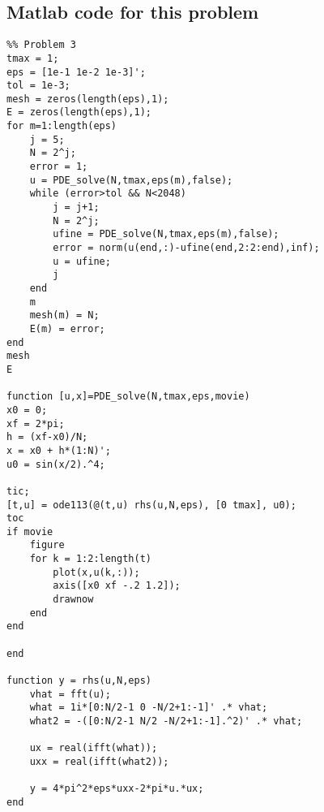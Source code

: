 \subsection*{Matlab code for this problem}
\begin{verbatim}
%% Problem 3
tmax = 1;
eps = [1e-1 1e-2 1e-3]';
tol = 1e-3;
mesh = zeros(length(eps),1);
E = zeros(length(eps),1);
for m=1:length(eps)
    j = 5;
    N = 2^j;
    error = 1;
    u = PDE_solve(N,tmax,eps(m),false);
    while (error>tol && N<2048)
        j = j+1;
        N = 2^j;
        ufine = PDE_solve(N,tmax,eps(m),false);
        error = norm(u(end,:)-ufine(end,2:2:end),inf);
        u = ufine;
        j
    end
    m
    mesh(m) = N;
    E(m) = error;
end
mesh
E

function [u,x]=PDE_solve(N,tmax,eps,movie)
x0 = 0;
xf = 2*pi;
h = (xf-x0)/N;
x = x0 + h*(1:N)';
u0 = sin(x/2).^4;
 
tic;
[t,u] = ode113(@(t,u) rhs(u,N,eps), [0 tmax], u0);
toc
if movie
    figure
    for k = 1:2:length(t)
        plot(x,u(k,:));
        axis([x0 xf -.2 1.2]);
        drawnow
    end
end

end
 
function y = rhs(u,N,eps)
    vhat = fft(u);
    what = 1i*[0:N/2-1 0 -N/2+1:-1]' .* vhat;
    what2 = -([0:N/2-1 N/2 -N/2+1:-1].^2)' .* vhat;
    
    ux = real(ifft(what));
    uxx = real(ifft(what2));
    
    y = 4*pi^2*eps*uxx-2*pi*u.*ux;
end
\end{verbatim}